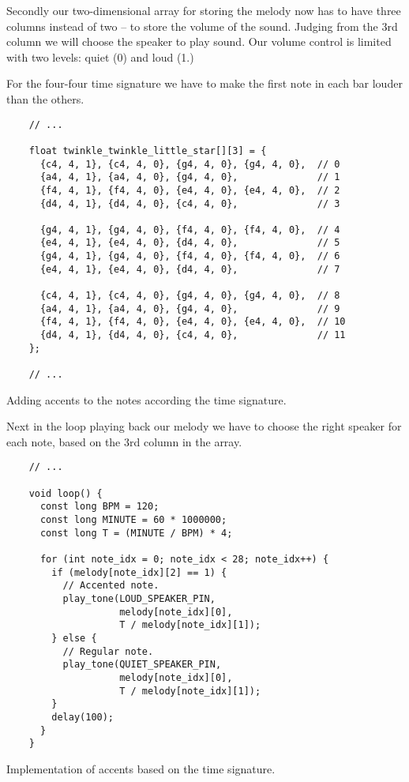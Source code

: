 \documentclass[../sparc.tex]{subfiles}
\begin{document}
Secondly our two-dimensional array for storing the melody now has to have three
columns instead of two -- to store the volume of the sound.  Judging from the 3rd
column we will choose the speaker to play sound.  Our volume control is limited
with two levels: quiet (0) and loud (1.)

For the four-four time signature we have to make the first note in each bar
louder than the others.

\begin{listing}[!h]
  \begin{verbatim}
    // ...

    float twinkle_twinkle_little_star[][3] = {
      {c4, 4, 1}, {c4, 4, 0}, {g4, 4, 0}, {g4, 4, 0},  // 0
      {a4, 4, 1}, {a4, 4, 0}, {g4, 4, 0},              // 1
      {f4, 4, 1}, {f4, 4, 0}, {e4, 4, 0}, {e4, 4, 0},  // 2
      {d4, 4, 1}, {d4, 4, 0}, {c4, 4, 0},              // 3

      {g4, 4, 1}, {g4, 4, 0}, {f4, 4, 0}, {f4, 4, 0},  // 4
      {e4, 4, 1}, {e4, 4, 0}, {d4, 4, 0},              // 5
      {g4, 4, 1}, {g4, 4, 0}, {f4, 4, 0}, {f4, 4, 0},  // 6
      {e4, 4, 1}, {e4, 4, 0}, {d4, 4, 0},              // 7

      {c4, 4, 1}, {c4, 4, 0}, {g4, 4, 0}, {g4, 4, 0},  // 8
      {a4, 4, 1}, {a4, 4, 0}, {g4, 4, 0},              // 9
      {f4, 4, 1}, {f4, 4, 0}, {e4, 4, 0}, {e4, 4, 0},  // 10
      {d4, 4, 1}, {d4, 4, 0}, {c4, 4, 0},              // 11
    };

    // ...
  \end{verbatim}
  \label{listing:adding-musical-scale-to-array}
  \caption{Adding accents to the notes according the time signature.}
\end{listing}

Next in the loop playing back our melody we have to choose the right speaker for
each note, based on the 3rd column in the array.

\begin{listing}[h]
  \begin{verbatim}
    // ...

    void loop() {
      const long BPM = 120;
      const long MINUTE = 60 * 1000000;
      const long T = (MINUTE / BPM) * 4;

      for (int note_idx = 0; note_idx < 28; note_idx++) {
        if (melody[note_idx][2] == 1) {
          // Accented note.
          play_tone(LOUD_SPEAKER_PIN,
                    melody[note_idx][0],
                    T / melody[note_idx][1]);
        } else {
          // Regular note.
          play_tone(QUIET_SPEAKER_PIN,
                    melody[note_idx][0],
                    T / melody[note_idx][1]);
        }
        delay(100);
      }
    }
  \end{verbatim}
  \label{listing:musical-scale-implementation}
  \caption{Implementation of accents based on the time signature.}
\end{listing}
\end{document}

